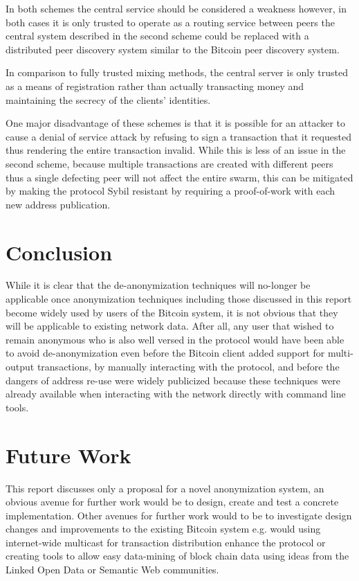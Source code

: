 In both schemes the central service should be considered a weakness however, in both cases it is only trusted to operate as a routing service between peers the central system described in the second scheme could be replaced with a distributed peer discovery system similar to the Bitcoin peer discovery system.

In comparison to fully trusted mixing methods, the central server is only trusted as a means of registration rather than actually transacting money and maintaining the secrecy of the clients' identities.

One major disadvantage of these schemes is that it is possible for an attacker to cause a denial of service attack by refusing to sign a transaction that it requested thus rendering the entire transaction invalid.  While this is less of an issue in the second scheme, because multiple transactions are created with different peers thus a single defecting peer will not affect the entire swarm, this can be mitigated by making the protocol Sybil\cite{sybil} resistant by requiring a proof-of-work with each new address publication.

\section{Conclusion}
While it is clear that the de-anonymization techniques will no-longer be applicable once anonymization techniques including those discussed in this report become widely used by users of the Bitcoin system, it is not obvious that they will be applicable to existing network data. After all, any user that wished to remain anonymous who is also well versed in the protocol would have been able to avoid de-anonymization even before the Bitcoin client\cite{bitcoin-qt} added support for multi-output transactions, by manually interacting with the protocol, and before the dangers of address re-use were widely publicized because these techniques were already available when interacting with the network directly with command line tools.

\section{Future Work}
This report discusses only a proposal for a novel anonymization system, an obvious avenue for further work would be to design, create and test a concrete implementation. Other avenues for further work would to be to investigate design changes and improvements to the existing Bitcoin system e.g. would using internet-wide multicast for transaction distribution enhance the protocol or creating tools to allow easy data-mining of block chain data using ideas from the Linked Open Data or Semantic Web communities.

